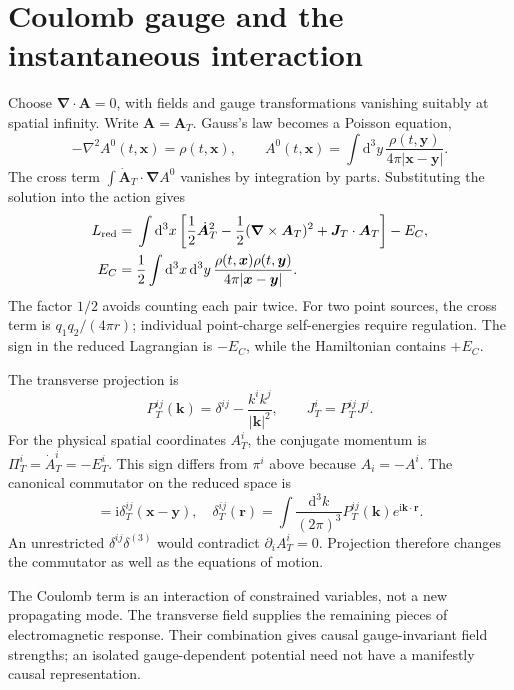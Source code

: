 \documentclass[11pt]{article}
\newcommand{\dd}{\mathrm d}
\newcommand{\ii}{\mathrm i}
\newcommand{\module}[1]{\clearpage\section{#1}}
\begin{document}
\module{Coulomb gauge and the instantaneous interaction}
Choose \(\bm\nabla\cdot\bm A=0\), with fields and gauge transformations
vanishing suitably at spatial infinity. Write \(\bm A=\bm A_T\).
Gauss's law becomes a Poisson equation,
\begin{equation}
 -\nabla^2 A^0(t,\bm x)=\rho(t,\bm x),\qquad
 A^0(t,\bm x)=\int\dd^3y\,
 \frac{\rho(t,\bm y)}{4\pi|\bm x-\bm y|}.
\end{equation}
The cross term \(\int\dot{\bm A}_T\cdot\bm\nabla A^0\) vanishes by
integration by parts. Substituting the solution into the action gives
\begin{align}
 L_{\rm red}={}&\int\dd^3x\left[
 \frac12\dot{\bm A}_T^2-\frac12(\bm\nabla\times\bm A_T)^2
 +\bm J_T\cdot\bm A_T\right]-E_C,\\
 E_C={}&\frac12\int\dd^3x\,\dd^3y\,
 \frac{\rho(t,\bm x)\rho(t,\bm y)}{4\pi|\bm x-\bm y|}.
 \label{eq:coulombenergy}
\end{align}
The factor \(1/2\) avoids counting each pair twice. For two point sources,
the cross term is \(q_1q_2/(4\pi r)\); individual point-charge self-energies
require regulation. The sign in the reduced Lagrangian is \(-E_C\), while
the Hamiltonian contains \(+E_C\).

The transverse projection is
\begin{equation}
 P_T^{ij}(\bm k)=\delta^{ij}-\frac{k^ik^j}{|\bm k|^2},\qquad
 J_T^i=P_T^{ij}J^j.
\end{equation}
For the physical spatial coordinates \(A_T^i\), the conjugate momentum is
\(\Pi_T^i=\dot A_T^i=-E_T^i\). This sign differs from \(\pi^i\) above
because \(A_i=-A^i\). The canonical commutator on the reduced space is
\begin{equation}
 [A_T^i(t,\bm x),\Pi_T^j(t,\bm y)]
 =\ii\delta_T^{ij}(\bm x-\bm y),\quad
 \delta_T^{ij}(\bm r)=\int\frac{\dd^3k}{(2\pi)^3}
 P_T^{ij}(\bm k)e^{\ii\bm k\cdot\bm r}.
\end{equation}
An unrestricted \(\delta^{ij}\delta^{(3)}\) would contradict
\(\partial_iA_T^i=0\). Projection therefore changes the commutator as well
as the equations of motion.

\begin{remarkbox}
The Coulomb term is an interaction of constrained variables, not a new
propagating mode. The transverse field supplies the remaining pieces of
electromagnetic response. Their combination gives causal gauge-invariant
field strengths; an isolated gauge-dependent potential need not have a
manifestly causal representation.
\end{remarkbox}
\end{document}
